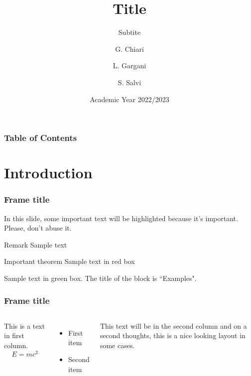 \documentclass{beamer}
\title{Title}
\subtitle{Subtite}
\author[Chiari, Gargani, Salvi] {G. Chiari \and L. Gargani \and S. Salvi}
\institute {Politecnico di Milano}
\date {Academic Year 2022/2023}
\begin{document}
\begin{frame}
\titlepage
\end{frame}

\begin{frame}
\frametitle{Table of Contents}
\tableofcontents
\end{frame}





\section{Introduction}


\begin{frame}
\frametitle{Frame title}

In this slide, some important text will be \alert{highlighted} because it's important.
Please, don't abuse it.

\begin{block}{Remark}
Sample text
\end{block}

\begin{alertblock}{Important theorem}
Sample text in red box
\end{alertblock}

\begin{examples}
Sample text in green box. The title of the block is ``Examples".
\end{examples}

\end{frame}


\begin{frame}
\frametitle{Frame title}

\begin{columns}

This is a text in first column.
$$E=mc^2$$
\begin{itemize}
	\item First item
	\item Second item
\end{itemize}

This text will be in the second column and on a second thoughts, this is a nice looking layout in some cases.

\end{columns}

\end{frame}
\end{document}
